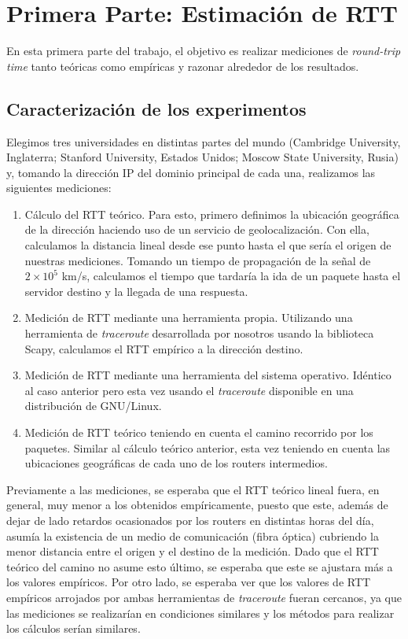 \newpage

\section{Primera Parte: Estimación de RTT}
En esta primera parte del trabajo, el objetivo es realizar mediciones de
\emph{round-trip time} tanto teóricas como empíricas y razonar alrededor de
los resultados.

\subsection{Caracterización de los experimentos}

Elegimos tres universidades en distintas partes del mundo (Cambridge
University, Inglaterra; Stanford University, Estados Unidos; Moscow State
University, Rusia) y, tomando la dirección IP del dominio principal de cada
una, realizamos las siguientes mediciones:
\begin{enumerate}
    \item Cálculo del RTT teórico. Para esto, primero definimos la ubicación
        geográfica de la dirección haciendo uso de un servicio de
        geolocalización. Con ella, calculamos la distancia lineal desde ese
        punto hasta el que sería el origen de nuestras mediciones. Tomando un
        tiempo de propagación de la señal de $2 \times 10^5$ km/s, calculamos
        el tiempo que tardaría la ida de un paquete hasta el servidor destino
        y la llegada de una respuesta.
    \item Medición de RTT mediante una herramienta propia. Utilizando una
        herramienta de \emph{traceroute} desarrollada por nosotros usando la
        biblioteca Scapy, calculamos el RTT empírico a la dirección destino.
    \item Medición de RTT mediante una herramienta del sistema operativo.
        Idéntico al caso anterior pero esta vez usando el \emph{traceroute}
        disponible en una distribución de GNU/Linux.
    \item Medición de RTT teórico teniendo en cuenta el camino recorrido por
        los paquetes. Similar al cálculo teórico anterior, esta vez teniendo
        en cuenta las ubicaciones geográficas de cada uno de los routers
        intermedios.
\end{enumerate}

Previamente a las mediciones, se esperaba que el RTT teórico lineal fuera, en
general, muy menor a los obtenidos empíricamente, puesto que este, además de
dejar de lado retardos ocasionados por los routers en distintas horas del día,
asumía la existencia de un medio de comunicación (fibra óptica) cubriendo la
menor distancia entre el origen y el destino de la medición. Dado que el RTT
teórico del camino no asume esto último, se esperaba que este se ajustara más
a los valores empíricos. Por otro lado, se esperaba ver que los valores de RTT
empíricos arrojados por ambas herramientas de \emph{traceroute} fueran
cercanos, ya que las mediciones se realizarían en condiciones similares y los
métodos para realizar los cálculos serían similares.

